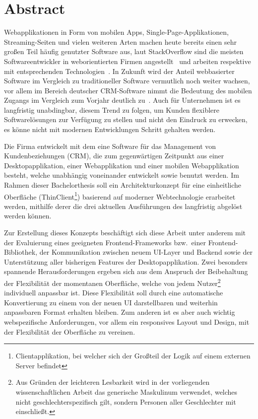 \chapter{Abstract}

Webapplikationen in Form von mobilen Apps, Single-Page-Applikationen, Streaming-Seiten und vielen weiteren Arten machen heute bereits einen sehr großen Teil häufig genutzter Software aus, laut StackOverflow sind die meisten Softwareentwickler in weborientierten Firmen angestellt~\parencite{stackoverflow_survey_company_2018} und arbeiten respektive mit entsprechenden Technologien~\parencite{stackoverflow_survey_technologies_2018}.
In Zukunft wird der Anteil webbasierter Software im Vergleich zu traditioneller Software vermutlich noch weiter wachsen, vor allem im Bereich deutscher CRM-Software nimmt die Bedeutung des mobilen Zugangs im Vergleich zum Vorjahr deutlich zu~\parencite[vgl.][]{bahr_capterra_2019}.
Auch für Unternehmen ist es langfristig unabdingbar, diesem Trend zu folgen, um Kunden flexiblere Softwarelösungen zur Verfügung zu stellen und nicht den Eindruck zu erwecken, es könne nicht mit modernen Entwicklungen Schritt gehalten werden.

Die Firma  entwickelt mit dem  eine Software für das Management von Kundenbeziehungen (\gls{CRM}), die zum gegenwärtigen Zeitpunkt aus einer Desktopapplikation, einer Webapplikation und einer mobilen Webapplikation besteht, welche unabhängig voneinander entwickelt sowie benutzt werden.
Im Rahmen dieser Bachelorthesis soll ein Architekturkonzept für eine einheitliche Oberfläche (ThinClient\footnote{Clientapplikation, bei welcher sich der Großteil der Logik auf einem externen Server befindet}) basierend auf moderner Webtechnologie erarbeitet werden, mithilfe derer die drei aktuellen Ausführungen des  langfristig abgelöst werden können.

Zur Erstellung dieses Konzepts beschäftigt sich diese Arbeit unter anderem mit der Evaluierung eines geeigneten Frontend-Frameworks bzw.\ einer Frontend-Bibliothek, der Kommunikation zwischen neuem UI-Layer und Backend sowie der Unterstützung aller bisherigen Features der Desktopapplikation.
Zwei besonders spannende Herausforderungen ergeben sich aus dem Anspruch der Beibehaltung der Flexibilität der momentanen Oberfläche, welche von jedem Nutzer\footnote{Aus Gründen der leichteren Lesbarkeit wird in der vorliegenden wissenschaftlichen Arbeit das generische Maskulinum verwendet, welches nicht geschlechterspezifisch gilt, sondern Personen aller Geschlechter mit einschließt.} individuell anpassbar ist. Diese Flexibilität soll durch eine automatische Konvertierung zu einem von der neuen UI darstellbaren und weiterhin anpassbaren Format erhalten bleiben. Zum anderen ist es aber auch wichtig webspezifische Anforderungen, vor allem ein responsives Layout und Design, mit der Flexibilität der Oberfläche zu vereinen.
